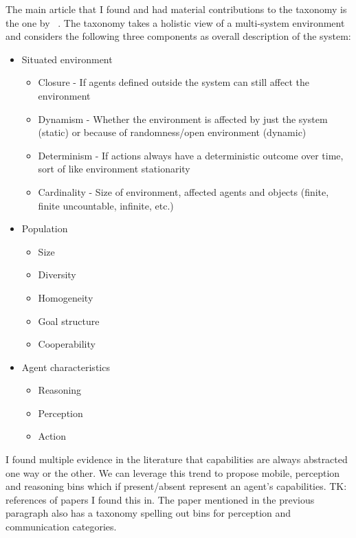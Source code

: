 \documentclass[letterpaper, 10 pt, conference]{ieeeconf}  %
\theoremstyle{definition}
\newcommand{\citet}[1]{\citeauthor{#1}~\cite{#1}}
\begin{document}
The main article that I found and had material contributions to the taxonomy is the one by
\citet{moya2007towards}. The taxonomy takes a holistic view of a multi-system environment and
considers the following three components as overall description of the system:
\begin{itemize}{}
    \item Situated environment
    \begin{itemize}{}
        \item Closure - If agents defined outside the system can still affect the environment
        \item Dynamism - Whether the environment is affected by just the system (static) or because
        of randomness/open environment (dynamic)
        \item Determinism - If actions always have a deterministic outcome over time, sort of like
        environment stationarity
        \item Cardinality - Size of environment, affected agents and objects (finite, finite
        uncountable, infinite, etc.)
    \end{itemize}
    \item Population
    \begin{itemize}{}
        \item Size
        \item Diversity
        \item Homogeneity
        \item Goal structure 
        \item Cooperability 
    \end{itemize} 
    \item Agent characteristics
    \begin{itemize}{} 
    \item Reasoning 
    \item Perception 
    \item Action 
    \end{itemize} 
\end{itemize}

I found multiple evidence in the literature that capabilities are always abstracted one way or
the other. We can leverage this trend to propose mobile, perception and reasoning bins which if
present/absent represent an agent's capabilities. TK: references of papers I found this in. The
paper mentioned in the previous paragraph also has a taxonomy spelling out bins for perception
and communication categories.
\end{document}
